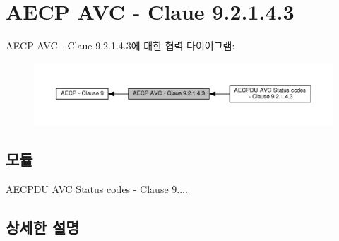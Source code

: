 \hypertarget{group__aecp__avc}{}\section{A\+E\+CP A\+VC -\/ Claue 9.2.1.4.3}
\label{group__aecp__avc}
A\+E\+CP A\+VC -\/ Claue 9.2.1.4.3에 대한 협력 다이어그램\+:
\nopagebreak
\begin{figure}[H]
\begin{center}
\leavevmode
\includegraphics[width=350pt]{group__aecp__avc}
\end{center}
\end{figure}
\subsection*{모듈}
\begin{DoxyCompactItemize}
\item 
\hyperlink{group___a_e_c_p__avc__status}{A\+E\+C\+P\+D\+U A\+V\+C Status codes -\/ Clause 9....}
\end{DoxyCompactItemize}


\subsection{상세한 설명}
